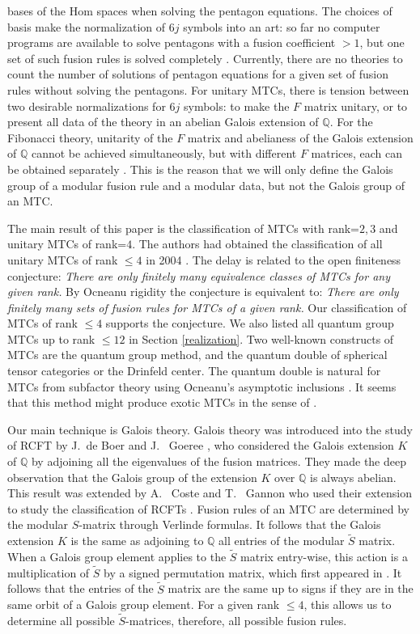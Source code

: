 \documentclass[12pt,psamsfonts]{amsart}
\newcommand{\Q}{\mathbb Q}
\newcommand{\tS}{\tilde{S}}
\numberwithin{equation}{section}
\theoremstyle{definition}
\begin{document}
bases of the Hom spaces when solving the pentagon equations. The
choices of basis make the normalization of $6j$ symbols into an
art: so far no computer programs are available to solve pentagons
with a fusion coefficient $>1$, but one set of such fusion rules
is solved completely \cite{HH}. Currently, there are no theories
to count the number of solutions of pentagon equations for a given
set of fusion rules without solving the pentagons.  For unitary MTCs,
there is tension between two desirable normalizations for $6j$
symbols: to make the $F$ matrix unitary, or to present all data of
the theory in an abelian Galois extension of $\Q$. For the
Fibonacci theory, unitarity of the $F$ matrix and abelianess of
the Galois extension of $\Q$ cannot be achieved simultaneously,
but with different $F$ matrices, each can be obtained separately
\cite{FW}. This is the reason that we will only define the Galois
group of a modular fusion rule and a modular data, but not the
Galois group of an MTC.

The main result of this paper is the classification of MTCs with
rank=$2,3$ and unitary MTCs of rank=$4$. The authors had obtained
the classification of all unitary MTCs of rank $\leq 4$ in 2004
\cite{Wang}. The delay is related to the open finiteness
conjecture:  \emph{There are only finitely many equivalence classes of MTCs for
any given rank.}
By Ocneanu rigidity the conjecture is equivalent to: \emph{There are only
finitely many sets of fusion rules for MTCs of a given rank.} Our
classification of MTCs of rank $\leq 4$ supports the conjecture.
We also listed all quantum group MTCs up to rank $\leq 12$ in
Section \ref{realization}.  Two
well-known constructs of MTCs are the quantum group method, and
the quantum double of spherical tensor categories or the Drinfeld
center. The quantum double is natural for MTCs from subfactor
theory using Ocneanu's asymptotic inclusions \cite{Evans}. It
seems that this method might produce exotic MTCs in the sense of
\cite{HRW}.

Our main technique is Galois theory. Galois theory was introduced
into the study of RCFT by J.~de Boer and J.~ Goeree \cite{dBG},
who considered the Galois extension $K$ of $\Q$ by adjoining all
the eigenvalues of the fusion matrices.  They made the deep
observation that the Galois group of the extension $K$ over $\Q$
is always abelian. This result was extended by A.~ Coste and T.~
Gannon who used their extension to study the classification of
RCFTs \cite{CG}.  Fusion
rules of an MTC are determined by the modular $S$-matrix through
Verlinde formulas. It follows that the Galois extension $K$ is the
same as adjoining to $\Q$ all entries of the modular $\tS$ matrix.
When a Galois group element applies to the $\tS$ matrix entry-wise,
this action is a multiplication of $\tS$ by a signed
permutation matrix, which first appeared in \cite{CG}.
It follows that the entries of the $\tS$ matrix are the same up
to signs if they are in the same orbit of a Galois group element.
For a given rank $\leq 4$, this allows us to determine all
possible $\tS$-matrices, therefore, all possible fusion rules.
\end{document}
